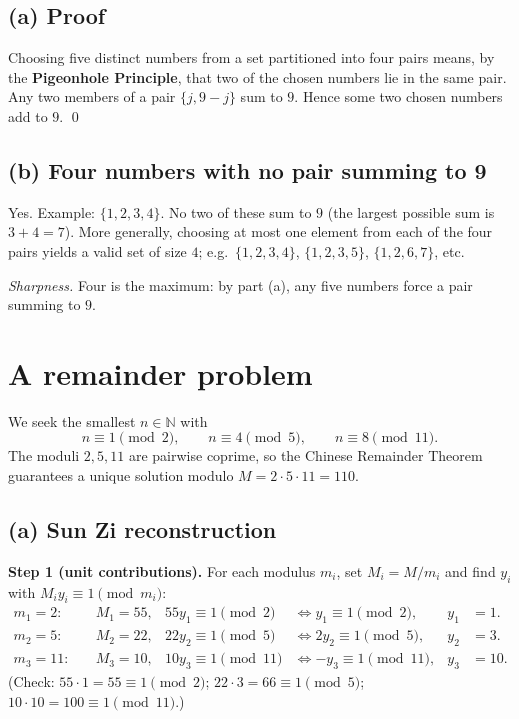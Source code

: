 \documentclass[11pt]{article}
\newcommand{\N}{\mathbb{N}}
\begin{document}
	\subsection*{(a) Proof}
	Choosing five distinct numbers from a set partitioned into four pairs means, by the \textbf{Pigeonhole Principle}, that two of the chosen numbers lie in the same pair. Any two members of a pair $\{j, 9-j\}$ sum to $9$. Hence some two chosen numbers add to $9$. \qed
	
	\subsection*{(b) Four numbers with no pair summing to 9}
	Yes. Example: $\{1,2,3,4\}$. No two of these sum to $9$ (the largest possible sum is $3+4=7$). More generally, choosing at most one element from each of the four pairs yields a valid set of size $4$; e.g.\ $\{1,2,3,4\}$, $\{1,2,3,5\}$, $\{1,2,6,7\}$, etc.
	
	\emph{Sharpness.} Four is the maximum: by part (a), any five numbers force a pair summing to $9$.
	
	\section{A remainder problem}
	
	We seek the smallest $n \in \N$ with
	\[
	n \equiv 1 \pmod 2,\qquad n \equiv 4 \pmod 5,\qquad n \equiv 8 \pmod{11}.
	\]
	The moduli $2,5,11$ are pairwise coprime, so the Chinese Remainder Theorem guarantees a unique solution modulo $M = 2\cdot 5\cdot 11 = 110$.
	
	\subsection*{(a) Sun Zi reconstruction}
	
	\textbf{Step 1 (unit contributions).} For each modulus $m_i$, set $M_i = M/m_i$ and find $y_i$ with $M_i y_i \equiv 1 \pmod{m_i}$:
	\[
	\begin{aligned}
		m_1=2:&\quad M_1 = 55, & 55y_1 \equiv 1 \pmod 2 &\iff y_1 \equiv 1 \pmod 2, & y_1 &= 1.\\
		m_2=5:&\quad M_2 = 22, & 22y_2 \equiv 1 \pmod 5 &\iff 2y_2 \equiv 1 \pmod 5, & y_2 &= 3.\\
		m_3=11:&\quad M_3 = 10, & 10y_3 \equiv 1 \pmod{11} &\iff -y_3 \equiv 1 \pmod{11}, & y_3 &= 10.
	\end{aligned}
	\]
	(Check: $55\cdot 1 = 55 \equiv 1 \pmod 2$; $22\cdot 3 = 66 \equiv 1 \pmod 5$; $10\cdot 10 = 100 \equiv 1 \pmod{11}$.)
	
\end{document}
